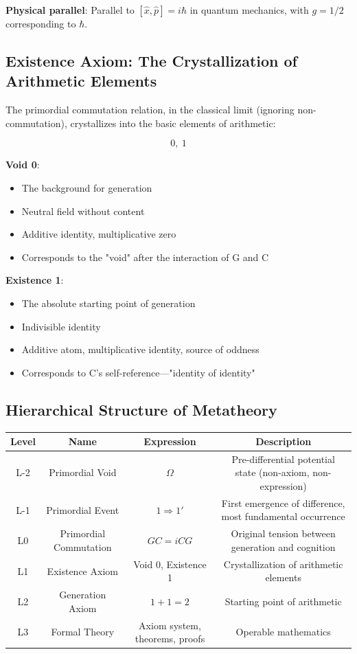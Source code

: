 \documentclass[12pt]{article}
\theoremstyle{definition}
\begin{document}
\textbf{Physical parallel}: Parallel to \([\hat{x}, \hat{p}] = i\hbar\) in quantum mechanics, with \(g = 1/2\) corresponding to \(\hbar\).

\subsection{Existence Axiom: The Crystallization of Arithmetic Elements}

The primordial commutation relation, in the classical limit (ignoring non-commutation), crystallizes into the basic elements of arithmetic:

\[
\boxed{0,\ 1}
\]

\textbf{Void 0}:
\begin{itemize}
    \item The background for generation
    \item Neutral field without content
    \item Additive identity, multiplicative zero
    \item Corresponds to the "void" after the interaction of G and C
\end{itemize}

\textbf{Existence 1}:
\begin{itemize}
    \item The absolute starting point of generation
    \item Indivisible identity
    \item Additive atom, multiplicative identity, source of oddness
    \item Corresponds to C's self-reference—"identity of identity"
\end{itemize}

\subsection{Hierarchical Structure of Metatheory}

\begin{center}
\begin{tabular}{|c|c|c|c|}
\hline
\textbf{Level} & \textbf{Name} & \textbf{Expression} & \textbf{Description} \\
\hline
L-2 & Primordial Void & \(\Omega\) & Pre-differential potential state (non-axiom, non-expression) \\
L-1 & Primordial Event & \(1 \Rightarrow 1'\) & First emergence of difference, most fundamental occurrence \\
L0 & Primordial Commutation & \(GC = iCG\) & Original tension between generation and cognition \\
L1 & Existence Axiom & Void 0, Existence 1 & Crystallization of arithmetic elements \\
L2 & Generation Axiom & \(1+1=2\) & Starting point of arithmetic \\
L3 & Formal Theory & Axiom system, theorems, proofs & Operable mathematics \\
\hline
\end{tabular}
\end{center}
\end{document}
